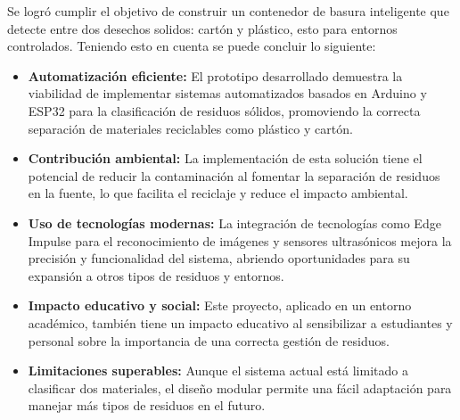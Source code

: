 Se logró cumplir el objetivo de construir un contenedor de basura inteligente que detecte entre dos desechos solidos: cartón y plástico, esto para entornos controlados. Teniendo esto en cuenta se puede concluir lo siguiente:

\begin{itemize}
  \item \textbf{Automatización eficiente:} El prototipo desarrollado demuestra la viabilidad de implementar sistemas automatizados basados en Arduino y ESP32 para la clasificación de residuos sólidos, promoviendo la correcta separación de materiales reciclables como plástico y cartón.
  \item \textbf{Contribución ambiental:} La implementación de esta solución tiene el potencial de reducir la contaminación al fomentar la separación de residuos en la fuente, lo que facilita el reciclaje y reduce el impacto ambiental.
  \item \textbf{Uso de tecnologías modernas:} La integración de tecnologías como Edge Impulse para el reconocimiento de imágenes y sensores ultrasónicos mejora la precisión y funcionalidad del sistema, abriendo oportunidades para su expansión a otros tipos de residuos y entornos.
  \item \textbf{Impacto educativo y social:} Este proyecto, aplicado en un entorno académico, también tiene un impacto educativo al sensibilizar a estudiantes y personal sobre la importancia de una correcta gestión de residuos.
  \item \textbf{Limitaciones superables:} Aunque el sistema actual está limitado a clasificar dos materiales, el diseño modular permite una fácil adaptación para manejar más tipos de residuos en el futuro.
\end{itemize}